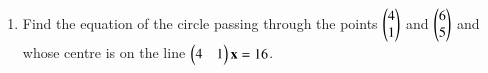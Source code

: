 \renewcommand{\theequation}{\theenumi}
\begin{enumerate}[label=\arabic*.,ref=\thesubsubsection.\theenumi]
%
\item Find the equation of the circle passing through the points $\begin{pmatrix}4\\1\end{pmatrix}$ and $\begin{pmatrix}6\\5\end{pmatrix}$ and whose centre is on the line $\begin{pmatrix}4&1\end{pmatrix}\mathbf{x}=16$.

\end{enumerate}